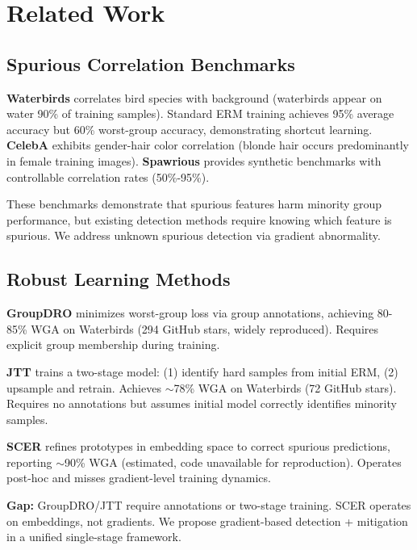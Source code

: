 \section{Related Work}

\subsection{Spurious Correlation Benchmarks}

\textbf{Waterbirds} \cite{sagawa2019distributionally} correlates bird species with background (waterbirds appear on water 90\% of training samples). Standard ERM training achieves 95\% average accuracy but 60\% worst-group accuracy, demonstrating shortcut learning. \textbf{CelebA} \cite{liu2015faceattributes} exhibits gender-hair color correlation (blonde hair occurs predominantly in female training images). \textbf{Spawrious} \cite{lynch2023spawrious} provides synthetic benchmarks with controllable correlation rates (50\%-95\%).

These benchmarks demonstrate that spurious features harm minority group performance, but existing detection methods require knowing which feature is spurious. We address unknown spurious detection via gradient abnormality.

\subsection{Robust Learning Methods}

\textbf{GroupDRO} \cite{sagawa2019distributionally} minimizes worst-group loss via group annotations, achieving 80-85\% WGA on Waterbirds (294 GitHub stars, widely reproduced). Requires explicit group membership during training.

\textbf{JTT} \cite{liu2021just} trains a two-stage model: (1) identify hard samples from initial ERM, (2) upsample and retrain. Achieves $\sim$78\% WGA on Waterbirds (72 GitHub stars). Requires no annotations but assumes initial model correctly identifies minority samples.

\textbf{SCER} \cite{park2025spurious} refines prototypes in embedding space to correct spurious predictions, reporting $\sim$90\% WGA (estimated, code unavailable for reproduction). Operates post-hoc and misses gradient-level training dynamics.

\textbf{Gap:} GroupDRO/JTT require annotations or two-stage training. SCER operates on embeddings, not gradients. We propose gradient-based detection + mitigation in a unified single-stage framework.

